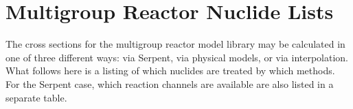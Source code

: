 \chapter{Multigroup Reactor Nuclide Lists}
\label{appendix_rmg_nuclide_lists}

The cross sections for the multigroup reactor model library may be calculated in one of three different ways: 
via Serpent, via physical models, or via interpolation.  What follows here is a listing of which nuclides
are treated by which methods.  For the Serpent case, which reaction channels are available are also listed in a 
separate table.

\vspace{1em}







\clearpage




